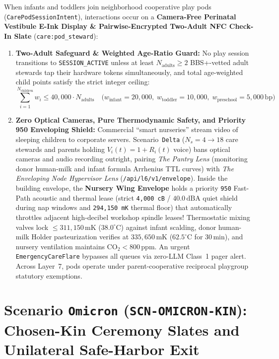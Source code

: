 When infants and toddlers join neighborhood cooperative play pods (\texttt{CarePodSessionIntent}), interactions occur on a \textbf{Camera-Free Perinatal Vestibule E-Ink Display \& Pairwise-Encrypted Two-Adult NFC Check-In Slate} (\texttt{care:pod\_steward}):
\begin{enumerate}
    \item \textbf{Two-Adult Safeguard \& Weighted Age-Ratio Guard:} No play session transitions to \texttt{SESSION\_ACTIVE} unless at least $N_{\mathrm{adults}} \ge 2$ BBS+-vetted adult stewards tap their hardware tokens simultaneously, and total age-weighted child points satisfy the strict integer ceiling:
    \begin{equation}
        \sum_{i=1}^{N_{\mathrm{children}}} w_i \le 40{,}000 \cdot N_{\mathrm{adults}} \quad \bigl(w_{\mathrm{infant}} = 20{,}000,\; w_{\mathrm{toddler}} = 10{,}000,\; w_{\mathrm{preschool}} = 5{,}000\,\mathrm{bp}\bigr)
    \end{equation}
    \item \textbf{Zero Optical Cameras, Pure Thermodynamic Safety, and Priority 950 Enveloping Shield:} Commercial ``smart nurseries'' stream video of sleeping children to corporate servers. Scenario~\texttt{Delta} ($N_s = 4 \to 18$ care stewards and parents holding $V_i(t) = 1 + R_i(t)$ voice) bans optical cameras and audio recording outright, pairing \textit{The Pantry Lens} (monitoring donor human-milk and infant formula Arrhenius TTL curves) with \textit{The Enveloping Node Hypervisor Lens} (\texttt{/api/l6/v1/envelope}). Inside the building envelope, the \textbf{Nursery Wing Envelope} holds a priority \texttt{950} Fast-Path acoustic and thermal lease (strict \texttt{4,000 cB} / $40.0\,\mathrm{dBA}$ quiet shield during nap windows and \texttt{294,150 mK} thermal floor) that automatically throttles adjacent high-decibel workshop spindle leases! Thermostatic mixing valves lock $\le 311{,}150\,\mathrm{mK}$ ($38.0^\circ\mathrm{C}$) against infant scalding, donor human-milk Holder pasteurization verifies at $335{,}650\,\mathrm{mK}$ ($62.5^\circ\mathrm{C}$ for $30\,\mathrm{min}$), and nursery ventilation maintains $\mathrm{CO}_2 < 800\,\mathrm{ppm}$. An urgent \texttt{EmergencyCareFlare} bypasses all queues via zero-LLM Class~1 pager alert. Across Layer~7, pods operate under parent-cooperative reciprocal playgroup statutory exemptions.
\end{enumerate}

\section{Scenario \texttt{Omicron} (\texttt{SCN-OMICRON-KIN}): Chosen-Kin Ceremony Slates and Unilateral Safe-Harbor Exit}
\label{sec:wave-c-omicron}

